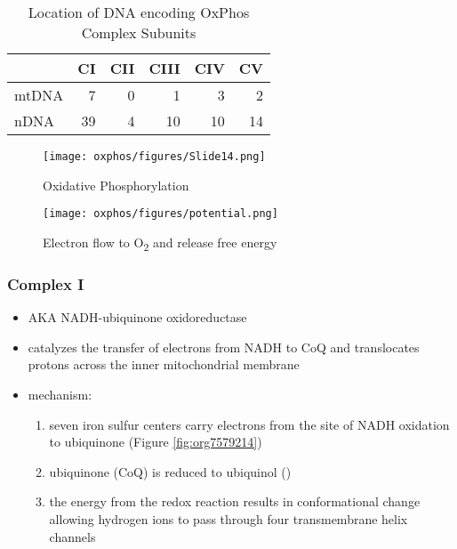 \documentclass[12pt]{scrartcl}
\begin{document}
\begin{table}[htbp]
\caption{\label{tab:orgc9b62aa}Location of DNA encoding OxPhos Complex Subunits}
\centering
\begin{tabular}{lrrrrr}
 & CI & CII & CIII & CIV & CV\\
\hline
mtDNA & 7 & 0 & 1 & 3 & 2\\
nDNA & 39 & 4 & 10 & 10 & 14\\
\end{tabular}
\end{table}

\begin{figure}[htbp]
\centering
\texttt{[image: oxphos/figures/Slide14.png]}
\caption[ETC]{\label{fig:org827620a}Oxidative Phosphorylation}
\end{figure}

\begin{figure}[htbp]
\centering
\texttt{[image: oxphos/figures/potential.png]}
\caption[redox]{\label{fig:org84d4242}Electron flow to O\textsubscript{2} and release free energy}
\end{figure}

\subsubsection{Complex I}
\label{sec:org17376b1}
\begin{itemize}
\item AKA NADH-ubiquinone oxidoreductase
\item catalyzes the transfer of electrons from NADH to CoQ and
translocates protons across the inner mitochondrial membrane
\end{itemize}

{\small{}}

\begin{itemize}
\item mechanism: 
\begin{enumerate}
\item seven iron sulfur centers carry electrons from the site of NADH
oxidation to ubiquinone (Figure \ref{fig:org7579214})
\item ubiquinone (CoQ) is reduced to ubiquinol ()
\item the energy from the redox reaction results in conformational
change allowing hydrogen ions to pass through four transmembrane
helix channels
\end{enumerate}
\end{itemize}
\end{document}

